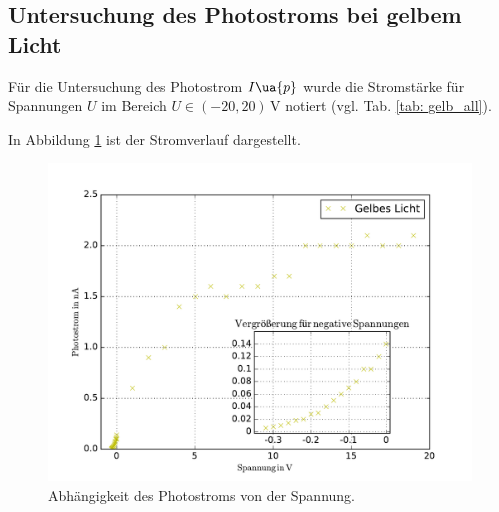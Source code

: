 \subsection{Untersuchung des Photostroms bei gelbem Licht}
Für die Untersuchung des Photostrom $I\ua{p}$ wurde die
Stromstärke für Spannungen $U$ im Bereich $U\in\left(-20,20\right)\,\si{\volt}$
notiert (vgl. Tab. \ref{tab: gelb_all}).

In Abbildung \ref{fig:gelb_all} ist der Stromverlauf dargestellt.
\begin{figure}
    \centering
    \includegraphics[width=1 \textwidth]{../Messdaten/gelb.pdf}
    \caption{Abhängigkeit des Photostroms von der Spannung.}
    \label{fig:gelb_all}
  \end{figure}
